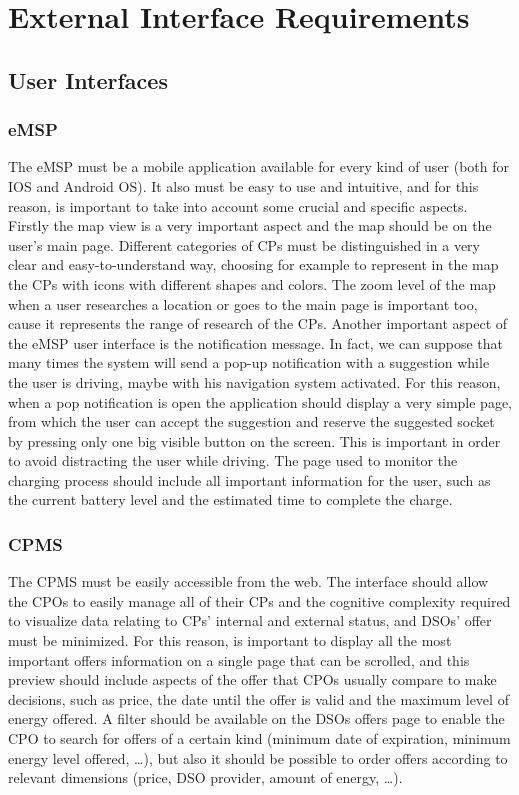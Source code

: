 \documentclass{Configuration_Files/PoliMi3i_thesis}
\begin{document}
\section{External Interface Requirements}

\subsection{User Interfaces}

\subsubsection{eMSP}

The eMSP must be a mobile application available for every kind of user (both for IOS and Android OS). It also must be easy to use and intuitive, and for this reason, is important to take into account some crucial and specific aspects. Firstly the map view is a very important aspect and the map should be on the user's main page. Different categories of CPs must be distinguished in a very clear and easy-to-understand way, choosing for example to represent in the map the CPs with icons with different shapes and colors. The zoom level of the map when a user researches a location or goes to the main page is important too, cause it represents the range of research of the CPs. Another important aspect of the eMSP user interface is the notification message. In fact, we can suppose that many times the system will send a pop-up notification with a suggestion while the user is driving, maybe with his navigation system activated. For this reason, when a pop notification is open the application should display a very simple page, from which the user can accept the suggestion and reserve the suggested socket by pressing only one big visible button on the screen. This is important in order to avoid distracting the user while driving.
The page used to monitor the charging process should include all important information for the user, such as the current battery level and the estimated time to complete the charge. 

\subsubsection{CPMS}

The CPMS must be easily accessible from the web. The interface should allow the CPOs to easily manage all of their CPs and the cognitive complexity required to visualize data relating to CPs' internal and external status, and DSOs' offer must be minimized. For this reason, is important to display all the most important offers information on a single page that can be scrolled, and this preview should include aspects of the offer that CPOs usually compare to make decisions, such as price, the date until the offer is valid and the maximum level of energy offered. A filter should be available on the DSOs offers page to enable the CPO to search for offers of a certain kind (minimum date of expiration, minimum energy level offered, …), but also it should be possible to order offers according to relevant dimensions (price, DSO provider, amount of energy, …).
\end{document}
